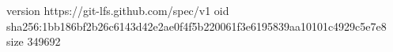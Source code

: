 version https://git-lfs.github.com/spec/v1
oid sha256:1bb186bf2b26c6143d42e2ae0f4f5b220061f3e6195839aa10101c4929c5e7e8
size 349692

